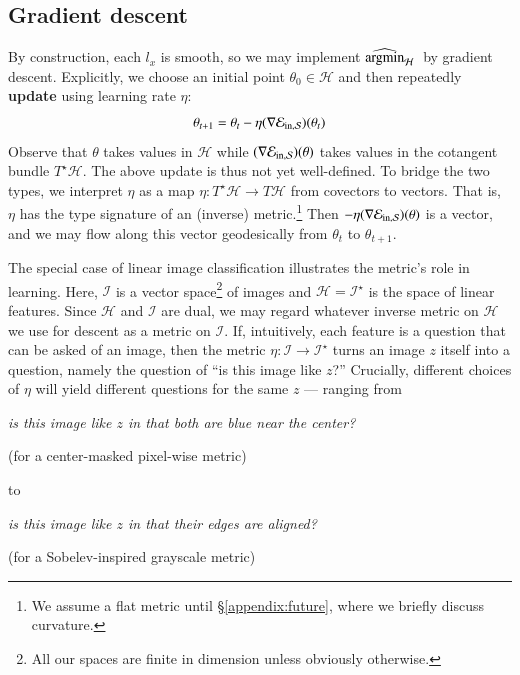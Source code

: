 \documentclass[openany, notitlepage, justified]{tufte-book}
\theoremstyle{plain}
\theoremstyle{definition}
\newcommand{\Hh}{\mathcal{H}}
\newcommand{\Ii}{\mathcal{I}}
\begin{document}
        \newpage
        \subsection{Gradient descent}

        By construction, each $l_x$ is smooth, so we may implement $\optH$ by
        gradient descent.  Explicitly, we choose an initial point $\theta_0\in \Hh$
        and then repeatedly \textbf{update} using learning rate $\eta$:
        $$
            \theta_{t+1} = \theta_t - \eta (\nabla \mathcal{E}_{\text{in},\mathcal{S}})(\theta_t) 
        $$
        Observe that $\theta$ takes values in $\Hh$ while $(\nabla \mathcal{E}_{\text{in},\mathcal{S}})(\theta)$ takes
        values in the cotangent bundle $T^\star\Hh$.  The above update is
        thus not yet well-defined.  To bridge the two types, we
        interpret $\eta$ as a map $\eta: T^\star\Hh\to T\Hh$ from
        covectors to vectors.  That is, $\eta$ has the type signature
        of an (inverse) metric.\footnote{
            We assume a flat metric until \S\ref{appendix:future}, where we
            briefly discuss curvature.
        } Then $-\eta (\nabla \mathcal{E}_{\text{in},\mathcal{S}})(\theta)$ is a vector, and we may flow along this
        vector geodesically from $\theta_t$ to $\theta_{t+1}$. 

        The special case of linear image classification illustrates the
        metric's role in learning.  Here, $\Ii$ is a 
        vector space\footnote{
            All our spaces are finite in dimension unless
            obviously otherwise.
        } of images and $\Hh = \Ii^\star$ is the space of linear features.
        Since $\Hh$ and $\Ii$ are dual, we may regard whatever inverse metric
        on $\Hh$ we use for descent as a metric on $\Ii$.  If, intuitively,
        each feature is a question that can be asked of an image, then the
        metric $\eta:\Ii\to\Ii^\star$ turns an image $z$ itself into a
        question, namely the question of ``is this image like $z$?''  Crucially,
        different choices of $\eta$ will yield different questions for the same
        $z$ ---
        ranging from

        \centerline{
            \emph{is this image like $z$ in that both are blue near the center?}
        }\par\centerline{
            (for a center-masked pixel-wise metric)
        }

        \noindent
        to

        \centerline{
            \emph{is this image like $z$ in that their edges are aligned?}
        }\par\centerline{
            (for a Sobelev-inspired grayscale metric)
        }
\end{document}
